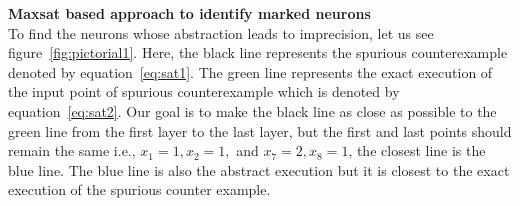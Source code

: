 \noindent\textbf{Maxsat based approach to identify marked neurons}\\
To find the neurons whose abstraction leads to imprecision, let us see figure~\ref{fig:pictorial1}. 
Here, the black line represents the spurious counterexample denoted by equation~\ref{eq:sat1}. 
The green line represents the exact execution of the input point of spurious counterexample 
which is denoted by equation~\ref{eq:sat2}. 
Our goal is to make the black line as close as possible to the green line from the first layer to the last layer, but the 
first and last points should remain the same i.e., $x_1=1,x_2=1,$ and $x_7=2, x_8=1$, the closest line is the blue line.
The blue line is also the abstract execution but it is closest to the exact execution of the spurious counter example. 
